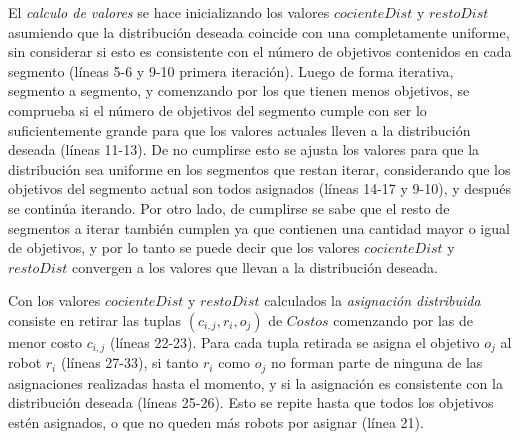 \begin{permissive}
El \emph{calculo de valores} se hace inicializando los valores $cocienteDist$ y
$restoDist$ asumiendo que la distribución deseada coincide con una
completamente uniforme, sin considerar si esto es consistente con el número de
objetivos contenidos en cada segmento (líneas 5-6 y 9-10 primera iteración).
Luego de forma iterativa, segmento a segmento, y comenzando por los que tienen
menos objetivos, se comprueba si el número de objetivos del segmento cumple con
ser lo suficientemente grande para que los valores actuales lleven a la
distribución deseada (líneas 11-13). De no cumplirse esto se ajusta los valores
para que la distribución sea uniforme en los segmentos que restan iterar,
considerando que los objetivos del segmento actual son todos asignados (líneas
14-17 y 9-10), y después se continúa iterando. Por otro lado, de
cumplirse se sabe que el resto de segmentos a iterar también cumplen ya que
contienen una cantidad mayor o igual de objetivos, y por lo tanto se puede
decir que los valores $cocienteDist$ y $restoDist$ convergen a los valores que
llevan a la distribución deseada.
\end{permissive}



Con los valores $cocienteDist$ y $restoDist$ calculados la \emph{asignación
distribuida} consiste en retirar las tuplas $(c_{i,j},r_i,o_j)$ de $Costos$
comenzando por las de menor costo $c_{i,j}$ (líneas 22-23). Para cada tupla retirada
se asigna el objetivo $o_j$ al robot $r_i$ (líneas 27-33), si tanto $r_i$ como $o_j$ no forman parte de
ninguna de las asignaciones realizadas hasta el momento, y si la asignación es consistente
con la distribución deseada (líneas 25-26). Esto se repite hasta que
todos los objetivos estén asignados, o que no queden más robots por asignar
(línea 21).

